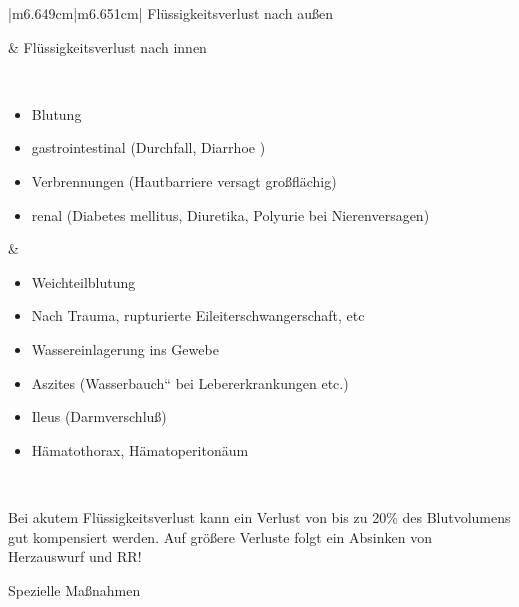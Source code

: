 \documentclass{article}
\begin{document}
\begin{center}
\tablehead{}\begin{supertabular}{|m{6.649cm}|m{6.651cm}|}
\hline
Fl\"ussigkeitsverlust nach au{\ss}en

 &
Fl\"ussigkeitsverlust nach innen

\\\hline
\begin{itemize}
\item Blutung

\item gastrointestinal (Durchfall, Diarrhoe )

\item Verbrennungen (Hautbarriere versagt  gro{\ss}\-fl\"achig)

\item renal (Diabetes mellitus, Diuretika, Polyurie bei  Nierenversagen)

\end{itemize}
 &
\begin{itemize}
\item Weichteilblutung

\end{itemize}
\begin{itemize}
\item Nach Trauma, rupturierte Eileiter\-schwanger\-schaft, etc

\end{itemize}
\begin{itemize}
\item Wassereinlagerung ins Gewebe

\item Aszites ({\quotedblbase}Wasserbauch{\textquotedblleft} bei
Lebererkrankungen  etc.)

\item Ileus (Darmverschlu{\ss})

\item H\"amatothorax, H\"amatoperiton\"aum

\end{itemize}
\\\hline
\end{supertabular}
\end{center}
Bei akutem Fl\"ussigkeitsverlust kann ein Verlust von bis zu 20\% des
Blutvolumens  gut kompensiert werden. Auf gr\"o{\ss}ere Verluste  folgt
ein Absinken von Herzauswurf und RR!

Spezielle Ma{\ss}nahmen
\end{document}

